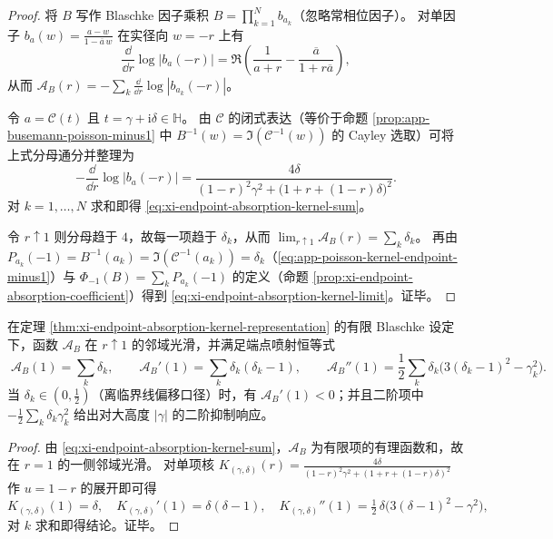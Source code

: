 \begin{proof}
将 \(B\) 写作 Blaschke 因子乘积 \(B=\prod_{k=1}^{N}b_{a_k}\)（忽略常相位因子）。
对单因子 \(b_a(w)=\frac{a-w}{1-\overline{a}\,w}\) 在实径向 \(w=-r\) 上有
\[
\frac{\dd}{\dd r}\log|b_a(-r)|
=\Re\!\left(\frac{1}{a+r}-\frac{\overline a}{1+r\overline a}\right),
\]
从而 \(\mathcal{A}_B(r)=-\sum_k \frac{\dd}{\dd r}\log|b_{a_k}(-r)|\)。
\par
令 \(a=\mathcal{C}(t)\) 且 \(t=\gamma+\mathrm{i}\delta\in\mathbb{H}\)。
由 \(\mathcal{C}\) 的闭式表达（等价于命题 \ref{prop:app-busemann-poisson-minus1} 中 \(B^{-1}(w)=\Im(\mathcal{C}^{-1}(w))\) 的 Cayley 选取）可将上式分母通分并整理为
\[
-\frac{\dd}{\dd r}\log|b_a(-r)|
=\frac{4\delta}{(1-r)^2\gamma^2+\bigl(1+r+(1-r)\delta\bigr)^2}.
\]
对 \(k=1,\dots,N\) 求和即得 \eqref{eq:xi-endpoint-absorption-kernel-sum}。
\par
令 \(r\uparrow 1\) 则分母趋于 \(4\)，故每一项趋于 \(\delta_k\)，从而
\(\lim_{r\uparrow 1}\mathcal{A}_B(r)=\sum_k\delta_k\)。
再由 \(P_{a_k}(-1)=B^{-1}(a_k)=\Im(\mathcal{C}^{-1}(a_k))=\delta_k\)（\eqref{eq:app-poisson-kernel-endpoint-minus1}）与 \(\Phi_{-1}(B)=\sum_k P_{a_k}(-1)\) 的定义（命题 \ref{prop:xi-endpoint-absorption-coefficient}）得到 \eqref{eq:xi-endpoint-absorption-kernel-limit}。证毕。
\end{proof}


\begin{theorem}[端点喷射不变量：\texorpdfstring{$\mathcal{A}_B$}{A\_B} 在 \texorpdfstring{$r=1$}{r=1} 的低阶导数给出可核验“矩”]\label{thm:xi-endpoint-absorption-jet-moments}
在定理 \ref{thm:xi-endpoint-absorption-kernel-representation} 的有限 Blaschke 设定下，函数 \(\mathcal{A}_B\) 在 \(r\uparrow 1\) 的邻域光滑，并满足端点喷射恒等式
\[
\boxed{\;
\mathcal{A}_B(1)=\sum_{k}\delta_k,\qquad
\mathcal{A}_B'(1)=\sum_{k}\delta_k(\delta_k-1),\qquad
\mathcal{A}_B''(1)=\frac12\sum_{k}\delta_k\bigl(3(\delta_k-1)^2-\gamma_k^2\bigr).\;}
\]
当 \(\delta_k\in(0,\tfrac12)\)（离临界线偏移口径）时，有 \(\mathcal{A}_B'(1)<0\)；并且二阶项中
\(-\tfrac12\sum_k\delta_k\gamma_k^2\)
给出对大高度 \(|\gamma|\) 的二阶抑制响应。
\end{theorem}

\begin{proof}
由 \eqref{eq:xi-endpoint-absorption-kernel-sum}，\(\mathcal{A}_B\) 为有限项的有理函数和，故在 \(r=1\) 的一侧邻域光滑。
对单项核
\(
K_{(\gamma,\delta)}(r)=\frac{4\delta}{(1-r)^2\gamma^2+(1+r+(1-r)\delta)^2}
\)
作 \(u=1-r\) 的展开即可得
\[
K_{(\gamma,\delta)}(1)=\delta,\quad
K_{(\gamma,\delta)}'(1)=\delta(\delta-1),\quad
K_{(\gamma,\delta)}''(1)=\tfrac12\,\delta\bigl(3(\delta-1)^2-\gamma^2\bigr),
\]
对 \(k\) 求和即得结论。证毕。
\end{proof}

